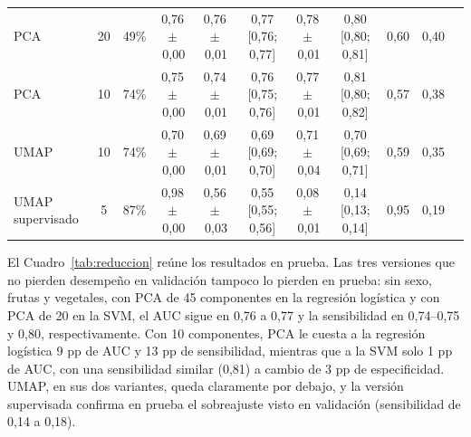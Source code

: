 \begin{table}[!t]
\begin{tabular}{@{}lcccccccccc@{}}
\quad PCA & 20 & 49\% & 0,76\,$\pm$\,0,00 & 0,76\,$\pm$\,0,01 & 0,77 [0,76; 0,77] & 0,78\,$\pm$\,0,01 & 0,80 [0,80; 0,81] & 0,60 & 0,40 \\
\quad PCA & 10 & 74\% & 0,75\,$\pm$\,0,00 & 0,74\,$\pm$\,0,01 & 0,76 [0,75; 0,76] & 0,77\,$\pm$\,0,01 & 0,81 [0,80; 0,82] & 0,57 & 0,38 \\
\quad UMAP & 10 & 74\% & 0,70\,$\pm$\,0,00 & 0,69\,$\pm$\,0,01 & 0,69 [0,69; 0,70] & 0,71\,$\pm$\,0,04 & 0,70 [0,69; 0,71] & 0,59 & 0,35 \\
\quad UMAP supervisado & 5 & 87\% & 0,98\,$\pm$\,0,00 & 0,56\,$\pm$\,0,03 & 0,55 [0,55; 0,56] & 0,08\,$\pm$\,0,01 & 0,14 [0,13; 0,14] & 0,95 & 0,19 \\
\bottomrule
\end{tabular}
\end{table}

El Cuadro~\ref{tab:reduccion} reúne los resultados en prueba. Las tres versiones que no pierden desempeño en validación tampoco lo pierden en prueba: sin sexo, frutas y vegetales, con PCA de 45 componentes en la regresión logística y con PCA de 20 en la SVM, el AUC sigue en 0,76 a 0,77 y la sensibilidad en 0,74--0,75 y 0,80, respectivamente. Con 10 componentes, PCA le cuesta a la regresión logística 9 pp de AUC y 13 pp de sensibilidad, mientras que a la SVM solo 1 pp de AUC, con una sensibilidad similar (0,81) a cambio de 3 pp de especificidad. UMAP, en sus dos variantes, queda claramente por debajo, y la versión supervisada confirma en prueba el sobreajuste visto en validación (sensibilidad de 0,14 a 0,18).
